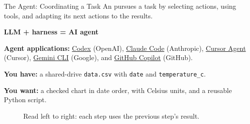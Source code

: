 \begin{frame}{The Agent: Coordinating a Task}
\small
\setlength{\abovecaptionskip}{0pt}
An  pursues a task by selecting actions, using tools, and adapting its next actions to the results.
\par\smallskip
{\centering\textbf{LLM + harness = AI agent}\par}
\par\smallskip
\textbf{Agent applications:}
\href{https://developers.openai.com/blog/codex-as-a-platform}{Codex} (OpenAI),
\href{https://code.claude.com/docs/en/how-claude-code-works}{Claude Code} (Anthropic),
\href{https://cursor.com/docs/agent/overview}{Cursor Agent} (Cursor),
\href{https://geminicli.com/docs/}{Gemini CLI} (Google), and
\href{https://docs.github.com/en/copilot/concepts/copilot-surfaces/copilot-on-github}{GitHub Copilot} (GitHub).

\par\smallskip
{}\par
\textbf{You have:} a shared-drive \texttt{data.csv} with \texttt{date} and \texttt{temperature\_c}.\par
\textbf{You want:} a checked chart in date order, with Celsius units, and a reusable Python script.
\begin{figure}\centering
{}
\caption{Read left to right: each step uses the previous step's result.}
\end{figure}
\end{frame}

